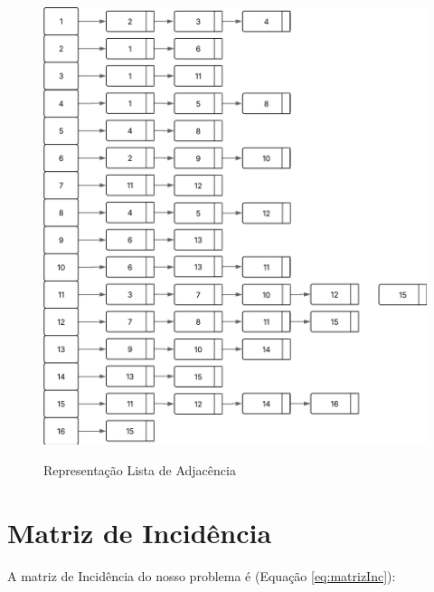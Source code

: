 	\begin{figure} [H]
		\centering
		\caption{Representação Lista de Adjacência}%
		\label{fig:grafListaAdj}%
		\includegraphics[width=1\linewidth,angle=0]{figuras/grafoListaAdj.png}%
		\\
	\end{figure}
	
	\section{Matriz de Incidência}\label{sec:incidencia}
	
	A matriz de Incidência do nosso problema é (Equação \ref{eq:matrizInc}):
	
